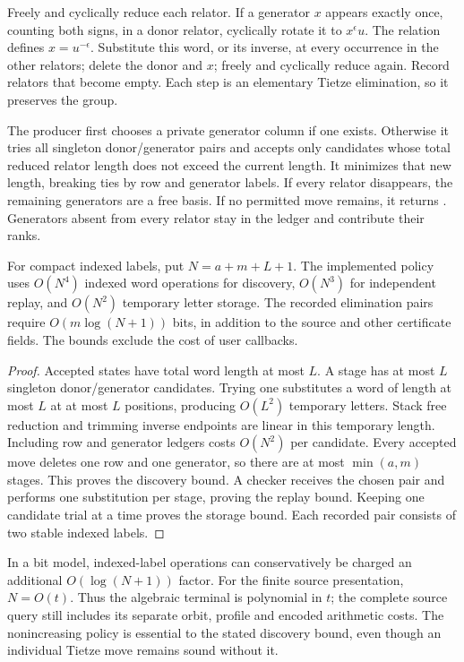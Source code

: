 Freely and cyclically reduce each relator.  If a generator $x$ appears
exactly once, counting both signs, in a donor relator, cyclically rotate
it to $x^\epsilon u$.  The relation defines $x=u^{-\epsilon}$.  Substitute
this word, or its inverse, at every occurrence in the other relators;
delete the donor and $x$; freely and cyclically reduce again.  Record
relators that become empty.  Each step is an elementary Tietze
elimination, so it preserves the group.

The producer first chooses a private generator column if one exists.
Otherwise it tries all singleton donor/generator pairs and accepts only
candidates whose total reduced relator length does not exceed the
current length.  It minimizes that new length, breaking ties by row and
generator labels.  If every relator disappears, the remaining generators
are a free basis.  If no permitted move remains, it returns
.  Generators absent from every relator stay in the
ledger and contribute their ranks.

\begin{proposition}
\label{euler-group:cost}
For compact indexed labels, put $N=a+m+L+1$.  The implemented policy uses
$O(N^4)$ indexed word operations for discovery, $O(N^3)$ for independent
replay, and $O(N^2)$ temporary letter storage.  The recorded elimination
pairs require $O(m\log(N+1))$ bits, in addition to the source and other
certificate fields.  The bounds exclude the cost of user callbacks.
\end{proposition}
\begin{proof}
Accepted states have total word length at most $L$.  A stage has at most
$L$ singleton donor/generator candidates.  Trying one substitutes a word
of length at most $L$ at at most $L$ positions, producing $O(L^2)$
temporary letters.  Stack free reduction and trimming inverse endpoints
are linear in this temporary length.  Including row and generator
ledgers costs $O(N^2)$ per candidate.  Every accepted move deletes one
row and one generator, so there are at most $\min(a,m)$ stages.  This
proves the discovery bound.  A checker receives the chosen pair and
performs one substitution per stage, proving the replay bound.  Keeping
one candidate trial at a time proves the storage bound.  Each recorded
pair consists of two stable indexed labels.
\end{proof}

In a bit model, indexed-label operations can conservatively be charged
an additional $O(\log(N+1))$ factor.  For the finite source presentation,
$N=O(t)$.  Thus the algebraic terminal is polynomial in $t$; the complete
source query still includes its separate orbit, profile and encoded
arithmetic costs.  The nonincreasing policy is essential to the stated
discovery bound, even though an individual Tietze move remains sound
without it.


